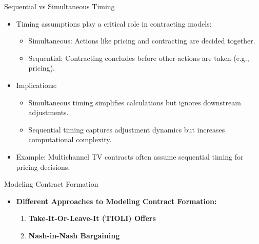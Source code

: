 \documentclass[aspectratio=169]{beamer}  %
\begin{document}
\begin{frame}{Sequential vs Simultaneous Timing}
    \begin{itemize}
        \item Timing assumptions play a critical role in contracting models:
        \begin{itemize}
            \item Simultaneous: Actions like pricing and contracting are decided together.
            \item Sequential: Contracting concludes before other actions are taken (e.g., pricing).
        \end{itemize}
        \item Implications:
        \begin{itemize}
            \item Simultaneous timing simplifies calculations but ignores downstream adjustments.
            \item Sequential timing captures adjustment dynamics but increases computational complexity.
        \end{itemize}
        \item Example: Multichannel TV contracts often assume sequential timing for pricing decisions.
    \end{itemize}
\end{frame}



\begin{frame}{Modeling Contract Formation}
\begin{itemize}
    \item \textbf{Different Approaches to Modeling Contract Formation:}
    \begin{enumerate}
        \item \textbf{Take-It-Or-Leave-It (TIOLI) Offers}
        
        \item \textbf{Nash-in-Nash Bargaining}
    \end{enumerate}
    \end{itemize}
\end{frame}
\end{document}
